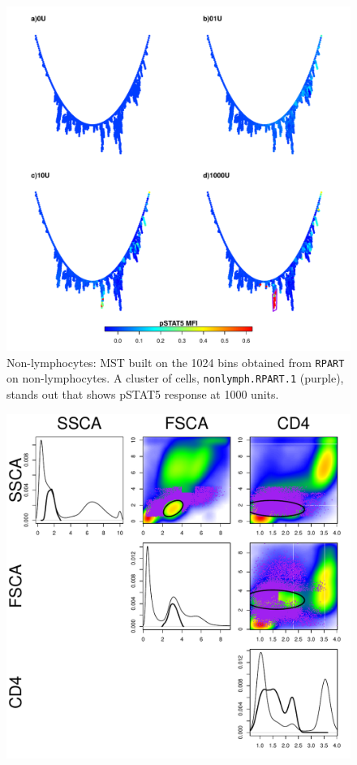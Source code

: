 \begin{figure}[!h]
\begin{minipage}{\textwidth}
\centering
\includegraphics[scale=.6]{figures/rpart-nonlymphocytes-mst-1024bin}
{ Non-lymphocytes: MST built on the 1024 bins obtained from \texttt{RPART} on non-lymphocytes. }
{
    A cluster of cells, \texttt{nonlymph.RPART.1} (purple), stands out that shows pSTAT5 response at 1000 units.
} 
\end{minipage}
%
\begin{minipage}{.6\textwidth}
\includegraphics[scale=.5]{figures/rpart-nonlymphocytes-scatter-clusters}

\end{minipage}
\end{figure}
